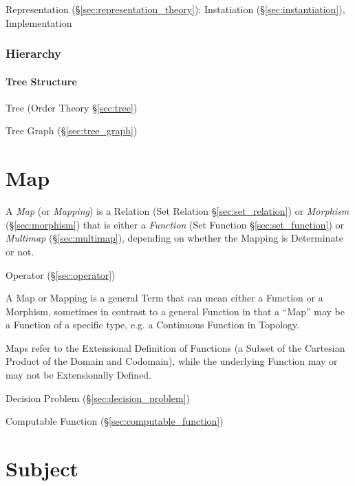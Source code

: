 Representation (\S\ref{sec:representation_theory}): Instatiation
(\S\ref{sec:instantiation}), Implementation



\subsubsection{Hierarchy}\label{sec:hierarchy}

\paragraph{Tree Structure}\label{sec:tree_structure}

Tree (Order Theory \S\ref{sec:tree})

Tree Graph (\S\ref{sec:tree_graph})



\section{Map}\label{sec:map}

A \emph{Map} (or \emph{Mapping}) is a Relation (Set Relation
\S\ref{sec:set_relation}) or \emph{Morphism} (\S\ref{sec:morphism})
that is either a \emph{Function} (Set Function
\S\ref{sec:set_function}) or \emph{Multimap} (\S\ref{sec:multimap}),
depending on whether the Mapping is Determinate or not.

Operator (\S\ref{sec:operator})

A Map or Mapping is a general Term that can mean either a Function or
a Morphism, sometimes in contrast to a general Function in that a
``Map'' may be a Function of a specific type, e.g. a Continuous
Function in Topology.

Maps refer to the Extensional Definition of Functions (a Subset of the
Cartesian Product of the Domain and Codomain), while the underlying
Function may or may not be Extensionally Defined.

Decision Problem (\S\ref{sec:decision_problem})

Computable Function (\S\ref{sec:computable_function})



\section{Subject}\label{sec:subject}

